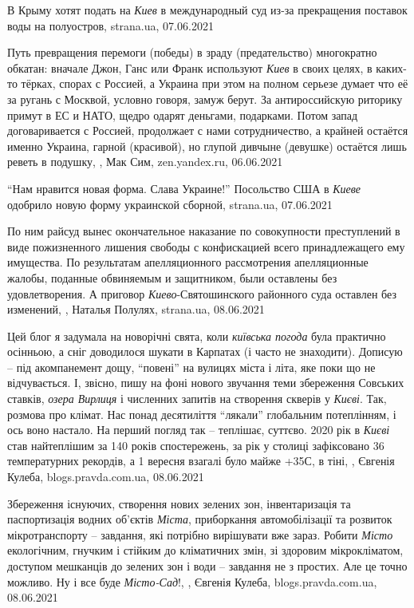 В Крыму хотят подать на \emph{Киев} в международный суд из-за прекращения поставок воды на полуостров,
strana.ua, 07.06.2021

Путь превращения перемоги (победы) в зраду (предательство) многократно обкатан:
вначале Джон, Ганс или Франк используют \emph{Киев} в своих целях, в каких-то
тёрках, спорах с Россией, а Украина при этом на полном серьезе думает что её за
ругань с Москвой, условно говоря, замуж берут. За антироссийскую риторику
примут в ЕС и НАТО, щедро одарят деньгами, подарками. Потом запад
договаривается с Россией, продолжает с нами сотрудничество, а крайней остаётся
именно Украина, гарной (красивой), но глупой дивчыне (девушке) остаётся лишь
реветь в подушку,
, Мак Сим, zen.yandex.ru, 06.06.2021

\enquote{Нам нравится новая форма. Слава Украине!} Посольство США в \emph{Киеве} одобрило новую форму украинской сборной,
strana.ua, 07.06.2021

По ним райсуд вынес окончательное наказание по совокупности преступлений в виде
пожизненного лишения свободы с конфискацией всего принадлежащего ему имущества.
По результатам апелляционного рассмотрения апелляционные жалобы, поданные
обвиняемым и защитником, были оставлены без удовлетворения. А приговор
\emph{Киево}-Святошинского районного суда оставлен без изменений,
, Наталья Полулях, strana.ua, 08.06.2021

Цей блог я задумала на новорічні свята, коли \emph{київська погода} була практично
осінньою, а сніг доводилося шукати в Карпатах (і часто не знаходити). Дописую –
під акомпанемент дощу, \enquote{повені} на вулицях міста і літа, яке поки що не
відчувається. І, звісно, пишу на фоні нового звучання теми збереження Совських
ставків, \emph{озера Вирлиця} і численних запитів на створення скверів у
\emph{Києві}. Так, розмова про клімат.  Нас понад десятиліття \enquote{лякали}
глобальним потеплінням, і ось воно настало. На перший погляд так – теплішає,
суттєво. 2020 рік в \emph{Києві} став найтеплішим за 140 років спостережень, за
рік у столиці зафіксовано 36 температурних рекордів, а 1 вересня взагалі було
майже +35С, в тіні,
, Євгенія Кулеба, blogs.pravda.com.ua, 08.06.2021

Збереження існуючих, створення нових зелених зон, інвентаризація та
паспортизація водних об'єктів \emph{Міста}, приборкання автомобілізації та
розвиток мікротранспорту – завдання, які потрібно вирішувати вже зараз.  Робити
\emph{Місто} екологічним, гнучким і стійким до кліматичних змін, зі здоровим
мікрокліматом, доступом мешканців до зелених зон і води – завдання не з
простих. Але це точно можливо.  Ну і все буде \emph{Місто-Сад}!,
, Євгенія Кулеба, blogs.pravda.com.ua, 08.06.2021

